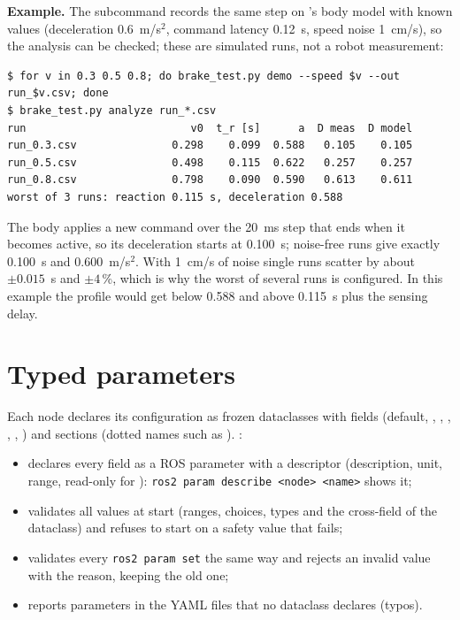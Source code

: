 \textbf{Example.} The  subcommand records the same step on 's body
model with known values (deceleration 0.6~m/s$^2$, command latency 0.12~s, speed noise 1~cm/s),
so the analysis can be checked; these are simulated runs, not a robot measurement:
\begin{lstlisting}
$ for v in 0.3 0.5 0.8; do brake_test.py demo --speed $v --out run_$v.csv; done
$ brake_test.py analyze run_*.csv
run                          v0  t_r [s]      a  D meas  D model
run_0.3.csv               0.298    0.099  0.588   0.105    0.105
run_0.5.csv               0.498    0.115  0.622   0.257    0.257
run_0.8.csv               0.798    0.090  0.590   0.613    0.611
worst of 3 runs: reaction 0.115 s, deceleration 0.588
\end{lstlisting}
The body applies a new command over the 20~ms step that ends when it becomes active, so its
deceleration starts at 0.100~s; noise-free runs give exactly 0.100~s and 0.600~m/s$^2$. With
1~cm/s of noise single runs scatter by about $\pm 0.015$~s and $\pm 4$\,\%, which is why the
worst of several runs is configured. In this example the profile would get
 below 0.588 and  above 0.115~s plus the sensing delay.

\section{Typed parameters}

Each node declares its configuration as frozen dataclasses with
 fields (default, , , , , , )
and  sections (dotted names such as ). :
\begin{itemize}
  \item declares every field as a ROS parameter with a descriptor (description, unit, range,
    read-only for ): \texttt{ros2 param describe <node> <name>} shows it;
  \item validates all values at start (ranges, choices, types and the cross-field
     of the dataclass) and refuses to start on a safety value that fails;
  \item validates every \texttt{ros2 param set} the same way and rejects an invalid value with
    the reason, keeping the old one;
  \item reports parameters in the YAML files that no dataclass declares (typos).
\end{itemize}

